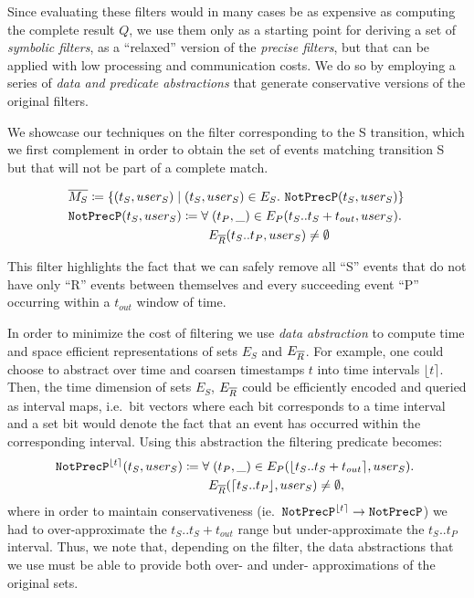 Since evaluating these filters would in many cases be as expensive as computing
the complete result $Q$, we use them only as a starting point for deriving a set
of {\em symbolic filters}, as a ``relaxed'' version of the {\em precise
filters}, but that can be applied with low processing and communication costs.
We do so by employing a series of {\em data and predicate abstractions} 
that generate conservative versions of the original filters.


We showcase our techniques on the filter corresponding to the S transition,
which we first complement in order to obtain the set of events matching
transition S but that will not be part of a complete match.

\newcommand{\oMS}{\overline{M_S}}
\newcommand{\NotExistsP}{\ident{NotExistsP}}
\newcommand{\NotPrecedesP}{\ident{NotPrecP}}

\newcommand{\interval}[1]{\lfloor #1 \rceil}
\newcommand{\uinterval}[1]{\lceil #1 \rfloor}
\newcommand{\hashid}[1]{\langle #1 \rangle}


\begin{align*}
&
\oMS \coloneq 
\{ (t_S, user_S) \mid (t_S, user_S) \in E_S .\ 
   \NotPrecedesP(t_S, user_S) 
\}
\\
&
\NotPrecedesP(t_S, user_S) \coloneq 
\forall\; (t_P, \_) \in E_P(t_S..t_S + t_{out}, user_S) .\ 
\\
&\qqqquad\qquad\quad
E_{\oR}(t_S..t_P, user_S) \neq \emptyset 
\end{align*}

This filter highlights the fact that we can safely remove all ``S'' events that
do not have only ``R'' events between themselves and every succeeding event
``P'' occurring within a $t_{out}$ window of time.

In order to minimize the cost of filtering we use {\em data
abstraction} to compute time and space efficient representations of sets $E_S$
and $E_{\overline{R}}$.
For example, one could choose to abstract over time and coarsen timestamps $t$
into time intervals $\interval{t}$. 
Then, the time dimension of sets $E_S$, $E_{\overline{R}}$ could be efficiently encoded
and queried as interval maps, i.e.\ bit vectors where each bit corresponds to a
time interval and a set bit would denote the fact that an event has occurred
within the corresponding interval.
Using this abstraction the filtering predicate becomes:
\begin{align*}
&
\NotPrecedesP^{\interval{t}}(t_S, user_S) \coloneq 
\forall\; (t_P, \_) \in E_P(\interval{t_S..t_S + t_{out}}, user_S) .\ 
\\
&
\qqqquad\qqquad
E_{\oR}(\uinterval{t_S..t_P}, user_S) \neq \emptyset ,
\end{align*}
where in order to maintain conservativeness (ie.\
$\NotPrecedesP^{\interval{t}} \rightarrow \NotPrecedesP$) we had to
over-approximate the $t_S..t_S + t_{out}$ range but under-approximate the
$t_S..t_P$ interval.
Thus, we note that, depending on the filter, the data abstractions that we
use must be able to provide both over- and under- approximations of the original
sets.

